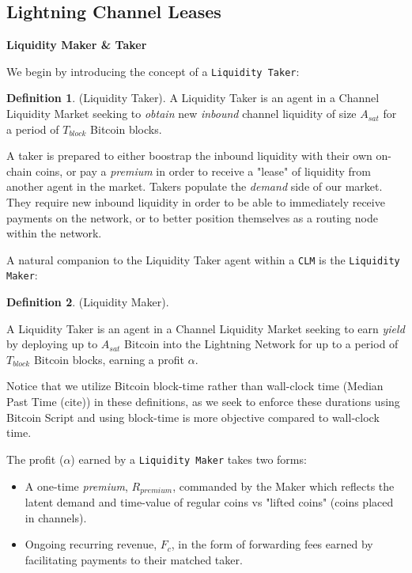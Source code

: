 \documentclass[10pt,a4paper]{article}
\theoremstyle{definition}
\newtheorem{definition}{Definition}[section]
\begin{document}
\subsection{Lightning Channel Leases}
\begin{center}
\textbf{Liquidity Maker \& Taker}
\end{center}

We begin by introducing the concept of a \texttt{Liquidity Taker}: 

\theoremstyle{definition}

\begin{definition}{(Liquidity Taker).} %
    A Liquidity Taker is an agent in a Channel Liquidity Market seeking to
    \emph{obtain} new \emph{inbound} channel liquidity of size $A_{sat}$ for a
    period of $T_{block}$ Bitcoin blocks. 
\end{definition}

A taker is prepared to either boostrap the inbound liquidity with their own
on-chain coins, or pay a \emph{premium} in order to receive a "lease" of
liquidity from another agent in the market. Takers populate the \emph{demand}
side of our market. They require new inbound liquidity in order to be able to
immediately receive payments on the network, or to better position themselves
as a routing node within the network. 

A natural companion to the Liquidity Taker agent within a \texttt{CLM} is the
\texttt{Liquidity Maker}: 

\theoremstyle{definition}
\begin{definition}{(Liquidity Maker).}

A Liquidity Taker is an agent in a Channel Liquidity Market seeking to earn
\emph{yield} by deploying up to $A_{sat}$ Bitcoin into the Lightning Network
for up to a period of $T_{block}$ Bitcoin blocks, earning a profit $\alpha$. 

\end{definition}

Notice that we utilize Bitcoin block-time rather than wall-clock time (Median Past
Time (cite)) in these definitions, as we seek to enforce these durations using
Bitcoin Script and using block-time is more objective compared to wall-clock time. 

The profit ($\alpha$) earned by a \texttt{Liquidity Maker} takes two forms: 
\begin{itemize}
   \item A one-time \emph{premium}, $R_{premium}$, commanded by the Maker which
       reflects the latent demand and time-value of regular coins vs "lifted
       coins" (coins placed in channels). 

   \item Ongoing recurring revenue, $F_c$,  in the form of forwarding fees
       earned by facilitating payments to their matched taker. 
\end{itemize} 
\end{document}
